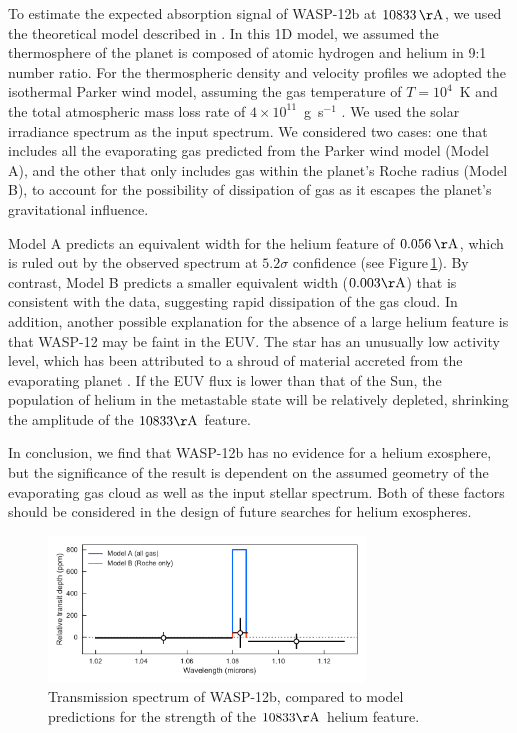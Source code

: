 \documentclass[RNAAS]{aastex62}
\begin{document}
To estimate the expected absorption signal of WASP-12b at $10833\,\mathrm{\AA}$,
we used the theoretical model described in \cite{oklopcic18}.
In this 1D model, we assumed the thermosphere of the planet is composed of atomic hydrogen and helium in 9:1 number
ratio. For the thermospheric density and velocity profiles we adopted the
isothermal Parker wind model, assuming the gas temperature of $T=10^4$~K and the
total atmospheric mass loss rate of $4\times 10^{11}$~g~s$^{-1}$ \citep[based on
the results of hydrodynamic simulations of atmospheric escape in WASP-12b
by][]{salz16}. We used the solar irradiance spectrum as the input spectrum. We
considered two cases: one that includes all the evaporating gas predicted from
the Parker wind model (Model A), and the other
that only includes gas within the planet's Roche radius (Model B), to account
for the possibility of dissipation of gas as it escapes the planet's gravitational influence.

Model A predicts an equivalent width for the helium feature of
$0.056\,\mathrm{\AA}$, which is ruled out by the observed spectrum at
$5.2\sigma$ confidence (see Figure\,\ref{fig:spectrum}). By contrast, Model B
predicts a smaller equivalent width ($0.003\mathrm{\AA}$) that is consistent with the data, suggesting rapid dissipation of the gas cloud.  In addition, another possible explanation for the absence of a large helium feature is that WASP-12 may be faint in the EUV. The star has an unusually low activity level, which has been attributed to a shroud of material accreted from the evaporating planet \citep{haswell17}. If the EUV flux is lower than that of the Sun, the population of helium in the metastable state will be relatively depleted, shrinking the amplitude of the $10833\mathrm{\AA}$ feature.



In conclusion, we find that WASP-12b has no evidence for a helium exosphere, but the
significance of the result is dependent on the assumed geometry of the
evaporating gas cloud as well as the input stellar spectrum.  Both of these factors should be considered in the design of future searches for helium exospheres.

\begin{figure}[b!]
\begin{centering}
\includegraphics[width = 0.75\textwidth]{Figures/fig1.pdf}
\caption{Transmission spectrum of WASP-12b, compared to model predictions for
the strength of the $10833\mathrm{\AA}$ helium feature.}
\end{centering}
\label{fig:spectrum}
\end{figure}




\end{document}
